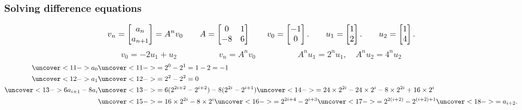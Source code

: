 \documentclass[9pt]{beamer}
\begin{document}
\begin{frame}[t]
 \frametitle{Solving difference equations}
 \[ v_n = \left[\begin{matrix} a_n \\ a_{n+1} \end{matrix}\right] = A^nv_0 
    \hspace{2em}
    A=\left[\begin{matrix} 0&1 \\ -8&6\end{matrix}\right]
    \hspace{2em}
    v_0=\left[\begin{matrix} -1 \\ 0\end{matrix}\right].
    \hspace{2em}
    u_1=\left[\begin{matrix} 1 \\ 2\end{matrix}\right].
    \hspace{2em}
    u_2=\left[\begin{matrix} 1 \\ 4\end{matrix}\right].
 \]
 \[ v_0=-2u_1+u_2 \hspace{5em}
    v_n = A^nv_0  \hspace{5em}
     A^nu_1=2^nu_1,\quad A^nu_2=4^nu_2
 \]
 \reminderbar
 \begin{align*}
  \uc<11->{a_0} &\uc<11->{= 2^0 - 2^1 = 1-2 = -1} \\
  \uc<12->{a_1} &\uc<12->{= 2^2 - 2^2 = 0} \\
  \uc<13->{6a_{i+1}-8a_i}
      &\uc<13->{= 6(2^{2i+2}-2^{i+2}) - 8(2^{2i}-2^{i+1}) }
       \uc<14->{= 24\tm 2^{2i} - 24\tm 2^i - 8 \tm 2^{2i} + 16 \tm 2^i} \\
      &\uc<15->{= 16\tm 2^{2i} - 8\tm 2^i}
       \uc<16->{= 2^{2i+4} - 2^{i+3} }
       \uc<17->{= 2^{2(i+2)} - 2^{(i+2)+1}}
       \uc<18->{= a_{i+2}.}
 \end{align*}

\end{frame}
\end{document}
